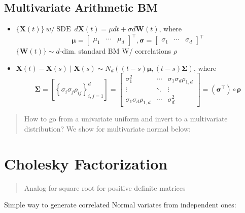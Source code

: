 \documentclass[
  oneside]{book}
\providecommand{\tightlist}{%
  \setlength{\itemsep}{0pt}\setlength{\parskip}{0pt}}
\begin{document}
\hypertarget{multivariate-arithmetic-bm}{%
\subsection{Multivariate Arithmetic BM}\label{multivariate-arithmetic-bm}}

\begin{itemize}
\tightlist
\item
  \(\{\mathbf{X}(t)\} \ w / \operatorname{SDE} \ d \mathbf{X}(t)=\mu d t+\sigma d \mathbf{W}(t)\), where
  \[
  \boldsymbol{\mu}=\left[\begin{array}{lll}
  \mu_1 & \cdots & \mu_d
  \end{array}\right]^{\top}, \boldsymbol{\sigma}=\left[\begin{array}{lll}
  \sigma_1 & \cdots & \sigma_d
  \end{array}\right]^{\top}
  \]
  \(\{\mathbf{W}(t)\} \sim d\)-dim. standard BM W/ correlations \(\rho\)
\item
  \(\mathbf{X}(t)-\mathbf{X}(s) \mid \mathbf{X}(s) \sim N_d((t-s) \boldsymbol{\mu},(t-s) \boldsymbol{\Sigma})\), where
  \[
  \boldsymbol{\Sigma}=\left[\left\{\sigma_i \sigma_j \rho_{i j}\right\}_{i, j=1}^d\right]=\left[\begin{array}{ccc}
  \sigma_1^2 & \cdots & \sigma_1 \sigma_d \rho_{1, d} \\
  \vdots & \ddots & \vdots \\
  \sigma_1 \sigma_d \rho_{1, d} & \cdots & \sigma_d^2
  \end{array}\right]=\left(\boldsymbol{\sigma}^{\boldsymbol{\top}}\right) \circ \boldsymbol{\rho}
  \]
\end{itemize}

\begin{quote}
How to go from a univariate uniform and invert to a multivariate distribution? We show for multivariate normal below:
\end{quote}

\hypertarget{cholesky-factorization}{%
\section{Cholesky Factorization}\label{cholesky-factorization}}

\begin{quote}
Analog for square root for positive definite matrices
\end{quote}

Simple way to generate correlated Normal variates from independent ones:
\end{document}
